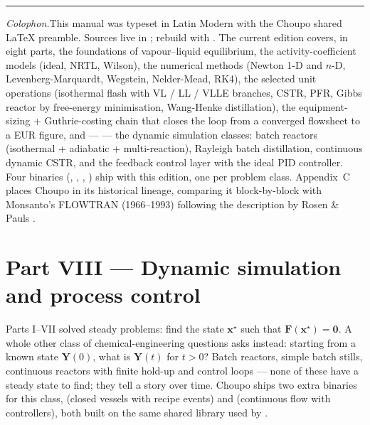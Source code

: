 \documentclass[11pt,a4paper]{article}
\newcommand{\xv}{\mathbf{x}}
\newcommand{\Fv}{\mathbf{F}}
\newcommand{\Yv}{\mathbf{Y}}                          %
\begin{document}
\vspace{2cm}
\noindent\rule{\linewidth}{0.3pt}
\noindent\small\textit{Colophon.}\quad This manual was typeset in Latin
Modern with the Choupo shared LaTeX preamble. Sources live in
; rebuild with . The current
edition covers, in eight parts, the foundations of
vapour--liquid equilibrium, the activity-coefficient models (ideal,
NRTL, Wilson), the numerical methods (Newton 1-D and $n$-D,
Levenberg-Marquardt, Wegstein, Nelder-Mead, RK4), the
selected unit operations (isothermal flash with VL / LL / VLLE
branches, CSTR, PFR, Gibbs reactor by free-energy minimisation,
Wang-Henke distillation), the equipment-sizing + Guthrie-costing
chain that closes the loop from a converged flowsheet to a EUR
figure, and ---  --- the dynamic simulation classes:
batch reactors (isothermal + adiabatic + multi-reaction), Rayleigh
batch distillation, continuous dynamic CSTR, and the feedback
control layer with the ideal PID controller.  Four binaries
(, , ,
)
ship with this edition, one per problem class.  Appendix~C
places Choupo in its historical lineage, comparing it block-by-block
with Monsanto's FLOWTRAN (1966--1993) following the description by
Rosen \& Pauls \cite{Rosen1977}.

\clearpage
\section*{Part VIII --- Dynamic simulation and process control}
{}

\setcounter{section}{0}

\noindent Parts I--VII solved steady problems: find the state
$\xv^{\star}$ such that $\Fv(\xv^{\star}) = \mathbf{0}$.  A whole
other class of chemical-engineering questions asks instead: starting
from a known state $\Yv(0)$, what is $\Yv(t)$ for $t > 0$?  Batch
reactors, simple batch stills, continuous reactors with finite
hold-up and control loops --- none of these have a steady state to
find; they tell a story over time.  Choupo ships two extra
binaries for this class,  (closed vessels with
recipe events) and  (continuous flow with
controllers), both built on the same shared library used by
.
\end{document}
